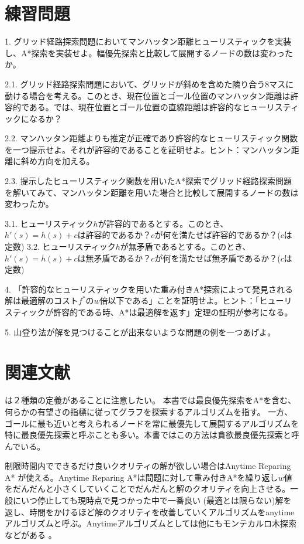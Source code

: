 \section{練習問題}

1. グリッド経路探索問題においてマンハッタン距離ヒューリスティックを実装し、A*探索を実装せよ。幅優先探索と比較して展開するノードの数は変わったか。

2.1. グリッド経路探索問題において、グリッドが斜めを含めた隣り合う8マスに動ける場合を考える。このとき、現在位置とゴール位置のマンハッタン距離は許容的である。では、現在位置とゴール位置の直線距離は許容的なヒューリスティックになるか？

2.2. マンハッタン距離よりも推定が正確であり許容的なヒューリスティック関数を一つ提示せよ。それが許容的であることを証明せよ。ヒント：マンハッタン距離に斜め方向を加える。

2.3. 提示したヒューリスティック関数を用いたA*探索でグリッド経路探索問題を解いてみて、マンハッタン距離を用いた場合と比較して展開するノードの数は変わったか。

3.1. ヒューリスティック$h$が許容的であるとする。このとき、$h'(s) = h(s) + c$は許容的であるか？$c$が何を満たせば許容的であるか？($c$は定数)
3.2. ヒューリスティック$h$が無矛盾であるとする。このとき、$h'(s) = h(s) + c$は無矛盾であるか？$c$が何を満たせば無矛盾であるか？($c$は定数)

4. 「許容的なヒューリスティックを用いた重み付きA*探索によって発見される解は最適解のコスト$f^*$の$w$倍以下である」ことを証明せよ。ヒント：「ヒューリスティックが許容的である時、A*は最適解を返す」定理の証明が参考になる。

5. 山登り法が解を見つけることが出来ないような問題の例を一つあげよ。




\section{関連文献}

は２種類の定義があることに注意したい。
本書では最良優先探索をA*を含む、何らかの有望さの指標に従ってグラフを探索するアルゴリズムを指す。
一方、ゴールに最も近いと考えられるノードを常に最優先して展開するアルゴリズムを特に最良優先探索と呼ぶことも多い。本書ではこの方法は貪欲最良優先探索と呼んでいる。


制限時間内でできるだけ良いクオリティの解が欲しい場合はAnytime Reparing A* \cite{likhachev2004ara}が使える。Anytime Reparing A*は問題に対して重み付きA*を繰り返し$w$値をだんだんと小さくしていくことでだんだんと解のクオリティを向上させる。一般にいつ停止しても現時点で見つかった中で一番良い (最適とは限らない)解を返し、時間をかけるほど解のクオリティを改善していくアルゴリズムをanytimeアルゴリズムと呼ぶ。Anytimeアルゴリズムとしては他にもモンテカルロ木探索などがある \cite{browne2012survey}。

